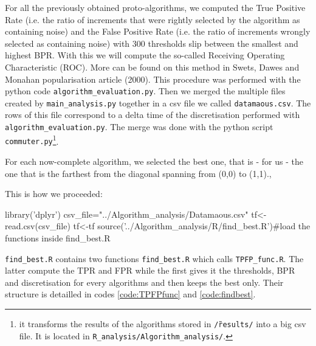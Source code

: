 \documentclass{article}\usepackage[]{graphicx}\usepackage[]{color}
\begin{document}
For all the previously obtained proto-algorithms, we computed the True Positive Rate (i.e. the ratio of increments that were rightly selected by the algorithm as containing noise) and the False Positive Rate (i.e. the ratio of increments wrongly selected as containing noise) with 300 thresholds slip between the smallest and highest BPR. With this we will compute the so-called Receiving Operating Characteristic (ROC). More can be found on this method in Swets, Dawes and Monahan popularisation article (2000). This procedure was performed with the python code {\tt algorithm{\_}evaluation.py}. Then we merged the multiple files created by {\tt main{\_}analysis.py} together in a csv file we called {\tt datamaous.csv}. The rows of this file correspond to a delta time of the discretisation performed with {\tt algorithm{\_}evaluation.py}. The merge was done with the python script {\tt commuter.py}\footnote{it transforms the results of the algorithms stored in {\tt \~/results/} into a big csv file. It is located in {\tt R{\_}analysis/Algorithm{\_}analysis/}.}.

For each now-complete algorithm, we selected the best one, that is - for us - the one that is the farthest from the diagonal spanning from (0,0) to (1,1).,

This is how we proceeded:

\begin{Schunk}
\begin{Sinput}
library('dplyr')
csv_file="../Algorithm_analysis/Datamaous.csv"
tf<-read.csv(csv_file)
tf<-tf %
source('../Algorithm_analysis/R/find_best.R')#load the functions inside find_best.R
\end{Sinput}
\end{Schunk}

{\tt find{\_}best.R} contains two functions {\tt find{\_}best.R} which calls {\tt TPFP{\_}func.R}. The latter compute the TPR and FPR while the first gives it the thresholds, BPR and discretisation for every algorithms and then keeps the best only. Their structure is detailled in codes {\ref{code:TPFPfunc}} and {\ref{code:findbest}}. 
\end{document}
